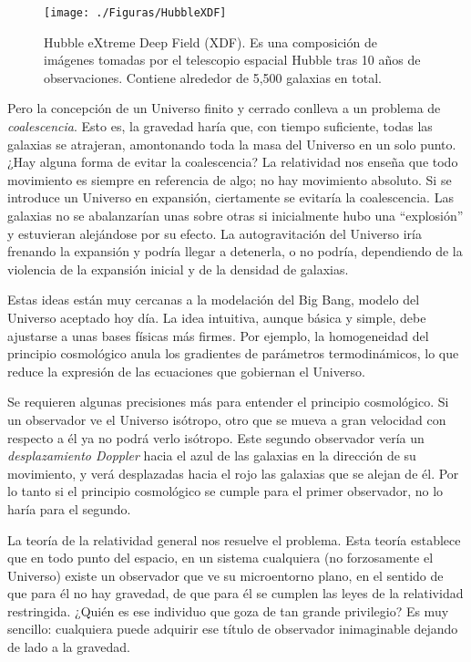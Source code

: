 \documentclass[a4paper,openright,12pt]{book}
\begin{document}
\begin{figure}
\centering
\texttt{[image: ./Figuras/HubbleXDF]}
\caption{\footnotesize{Hubble eXtreme Deep Field (XDF). Es una composición de imágenes tomadas por el telescopio espacial Hubble tras 10 años de observaciones. Contiene alrededor de 5,500 galaxias en total.}}
\end{figure}

Pero la concepción de un Universo finito y cerrado conlleva a un problema de \textit{coalescencia}. Esto es, la gravedad haría que, con tiempo suficiente, todas las galaxias se atrajeran, amontonando toda la masa del Universo en un solo punto. ¿Hay alguna forma de evitar la coalescencia? La relatividad nos enseña que todo movimiento es siempre en referencia de algo; no hay movimiento absoluto. Si se introduce un Universo en expansión, ciertamente se evitaría la coalescencia. Las galaxias no se abalanzarían unas sobre otras si inicialmente hubo una ``explosión'' y estuvieran alejándose por su efecto. La autogravitación del Universo iría frenando la expansión y podría llegar a detenerla, o no podría, dependiendo de la violencia de la expansión inicial y de la densidad de galaxias.

Estas ideas están muy cercanas a la modelación del Big Bang, modelo del Universo aceptado hoy día. La idea intuitiva, aunque básica y simple, debe ajustarse a unas bases físicas más firmes. Por ejemplo, la homogeneidad del principio cosmológico anula los gradientes de parámetros termodinámicos, lo que reduce la expresión de las ecuaciones que gobiernan el Universo.

Se requieren algunas precisiones más para entender el principio cosmológico. Si un observador ve el Universo isótropo, otro que se mueva a gran velocidad con respecto a él ya no podrá verlo isótropo. Este segundo observador vería un \textit{desplazamiento Doppler} hacia el azul de las galaxias en la dirección de su movimiento, y verá desplazadas hacia el rojo las galaxias que se alejan de él. Por lo tanto si el principio cosmológico se cumple para el primer observador, no lo haría para el segundo.

La teoría de la relatividad general nos resuelve el problema. Esta teoría establece que en todo punto del espacio, en un sistema cualquiera (no forzosamente el Universo) existe un observador que ve su microentorno plano, en el sentido de que para él no hay gravedad, de que para él se cumplen las leyes de la relatividad restringida. ¿Quién es ese individuo que goza de tan grande privilegio? Es muy sencillo: cualquiera puede adquirir ese título de observador inimaginable dejando de lado a la gravedad.
\end{document}
